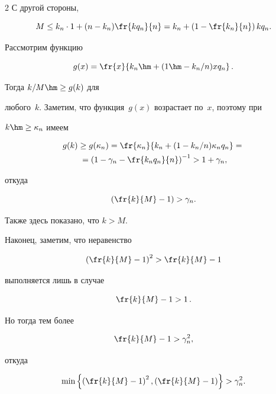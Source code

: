 \begin{multicols}{2}
С другой стороны,

$$

M \leq k_n \cdot 1 + (n-k_n)  \fr{kq_n}{n} =  k_n + \left(1-\fr{k_n}{n}\right) k q_n.

$$

Рассмотрим функцию 

$$

g(x) = \fr{x}{k_n \hm+ (1\hm-k_n/n) x q_n}\,.

$$

 Тогда $k/M \hm\geq g(k)$ для 

любого~$k$. Заметим, что функция~$g(x)$ возрастает по~$x$, поэтому при 

$k\hm\geq\kappa_n$ имеем

\begin{multline*}

g(k) \geq g(\kappa_n) =\fr{\kappa_n}{k_n+ (1-k_n/n) \kappa_n q_n} ={}\\

{}= \left(1- \gamma_n- \fr{k_n q_n}{n}\right)^{-1} > 1 + \gamma_n,

\end{multline*}

откуда

$$

\left(\fr{k}{M}-1\right) > \gamma_n.

$$

Также здесь показано, что $k>M$.



\columnbreak



Наконец, заметим, что неравенство 

$$

\left(\fr{k}{M}-1\right)^2 > \fr{k}{M}-1

$$

выполняется лишь в случае 

$$

\fr{k}{M}-1 > 1\,.

$$

 Но тогда тем более 

 $$

 \fr{k}{M}- 1>\gamma_n^2,

 $$

  откуда

$$

\min\left\{\left(\fr{k}{M}-1\right)^2,\left(\fr{k}{M}-1\right)\right\}  > \gamma_n^2.

$$




\end{multicols}

